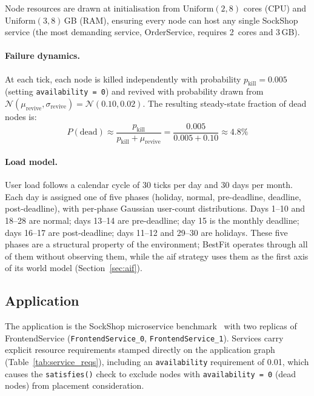 \documentclass[11pt, a4paper]{article}
\begin{document}
Node resources are drawn at initialisation from $\mathrm{Uniform}(2, 8)$ cores
(CPU) and $\mathrm{Uniform}(3, 8)$\,GB (RAM), ensuring every node can host any
single SockShop service (the most demanding service, OrderService, requires
2~cores and 3\,GB).

\paragraph{Failure dynamics.}
At each tick, each node is killed independently with probability
$p_\mathrm{kill} = 0.005$ (setting \texttt{availability = 0}) and revived with
probability drawn from $\mathcal{N}(\mu_\mathrm{revive}, \sigma_\mathrm{revive})
= \mathcal{N}(0.10, 0.02)$.
The resulting steady-state fraction of dead nodes is:
\begin{equation}
  P(\text{dead}) \approx \frac{p_\mathrm{kill}}{p_\mathrm{kill} +
  \mu_\mathrm{revive}} = \frac{0.005}{0.005 + 0.10} \approx 4.8\%
  \label{eq:dead_fraction}
\end{equation}

\paragraph{Load model.}
User load follows a calendar cycle of 30 ticks per day and 30 days per month.
Each day is assigned one of five phases (holiday, normal, pre-deadline,
deadline, post-deadline), with per-phase Gaussian user-count distributions.
Days 1--10 and 18--28 are normal; days 13--14 are pre-deadline; day 15 is the
monthly deadline; days 16--17 are post-deadline; days 11--12 and 29--30 are
holidays.
These five phases are a structural property of the environment; BestFit
operates through all of them without observing them, while the \gls{aif}
strategy uses them as the first axis of its world model
(Section~\ref{sec:aif}).

\subsection{Application}
\label{sec:application}

The application is the SockShop microservice benchmark~\cite{sockshop} with two
replicas of FrontendService (\texttt{FrontendService\_0},
\texttt{FrontendService\_1}).
Services carry explicit resource requirements stamped directly on the
application graph (Table~\ref{tab:service_reqs}), including an
\texttt{availability} requirement of 0.01, which causes the \texttt{satisfies()}
check to exclude nodes with \texttt{availability = 0} (dead nodes) from
placement consideration.
\end{document}
